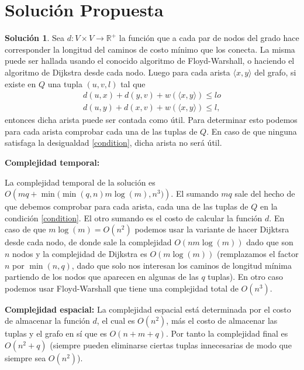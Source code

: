 \documentclass[10pt]{amsart}
\theoremstyle{definition}
\newtheorem{sol}[theorem]{Soluci\'on}
\numberwithin{equation}{section}
\newcommand{\rr}{\mathbb{R}}
\newcommand{\edge}[1]{\langle #1\rangle}
\begin{document}
\section{Soluci\'on Propuesta} \label{opt_sol}
	
	\begin{sol}\label{sol_optima_travel} Sea $d \colon V \times V \rightarrow \rr^+$ la funci\'on que a cada par de nodos del grado hace corresponder la longitud del caminos de costo m\'inimo que los conecta. La misma puede ser hallada usando el conocido algoritmo de Floyd-Warshall, o haciendo el algoritmo de Dijkstra desde cada nodo. Luego para cada arista $\edge{x,y}$ del grafo, si existe en $Q$ una tupla $(u,v,l)$ tal que
	\begin{align}\label{condition}
		d(u,x) + d(y,v) + w \left(\edge{x, y} \right) \le l o \\
		d(u,y) + d(x,v) + w \left(\edge{x, y} \right) \le l,
	\end{align}
	entonces dicha arista puede ser contada como \'util. Para determinar esto podemos para cada arista comprobar cada una de las tuplas de $Q$. En caso de que ninguna satisfaga la desigualdad \eqref{condition}, dicha arista no ser\'a \'util.
	\end{sol}

\textbf{Complejidad temporal:}

 La complejidad temporal de la soluci\'on es $O\left(mq + \min\big(\min(q,n) m\log(m), n^3\big) \right)$. El sumando $mq$ sale del hecho de que debemos comprobar para cada arista, cada una de las tuplas de $Q$ en la condici\'on \eqref{condition}. El otro sumando es el costo de calcular la funci\'on $d$. En caso de que $m \log(m) = O(n^2)$ podemos usar la variante de hacer Dijktsra desde cada nodo, de donde sale la complejidad $O(nm\log(m))$ dado que son $n$ nodos y la complejidad de Dijkstra es $O(m\log(m))$ (remplazamos el factor $n$ por $\min(n, q)$, dado que solo nos interesan los caminos de longitud m\'inima partiendo de los nodos que aparecen en algunas de las $q$ tuplas). En otro caso podemos usar Floyd-Warshall que tiene una complejidad total de $O(n^3)$.


\textbf{Complejidad espacial:}
	La complejidad espacial est\'a determinada por el costo de almacenar la funci\'on $d$, el cual es $O(n^2)$, m\'as el costo de almacenar las tuplas y el grafo en s\'i que es $O(n + m + q)$. Por tanto la complejidad final es $O(n^2 + q)$ (siempre pueden eliminarse ciertas tuplas innecesarias de modo que siempre sea $O(n^2)$).
\end{document}
